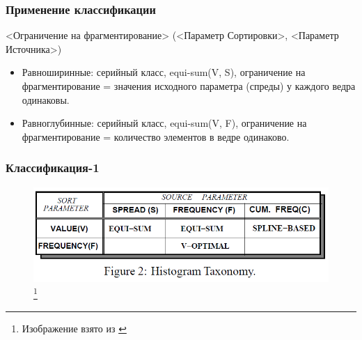 \documentclass{beamer}
\begin{document}
\begin{frame}
\frametitle{Применение классификации}

<\alert{Ограничение на фрагментирование}> (<\alert{Параметр Сортировки}>, <\alert{Параметр Источника}>)

\begin{itemize}
	
\item Равноширинные: серийный класс, \alert{equi-sum(V, S)}, ограничение на фрагментирование = значения исходного параметра (спреды) у каждого ведра  одинаковы.

\item Равноглубинные: серийный класс, \alert{equi-sum(V, F)}, ограничение на фрагментирование = количество элементов в ведре одинаково.

\end{itemize}

\end{frame}

\begin{frame}
\frametitle{Классификация-1}

\begin{figure}[htb]
	\includegraphics[width=\textwidth,height=0.65\textheight,keepaspectratio]{taxonomy-1.png} 
	\footnote{\tiny{Изображение взято из \cite{Poosala1996}}}
\end{figure}

\end{frame}
\end{document}
